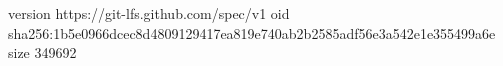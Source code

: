 version https://git-lfs.github.com/spec/v1
oid sha256:1b5e0966dcec8d4809129417ea819e740ab2b2585adf56e3a542e1e355499a6e
size 349692

